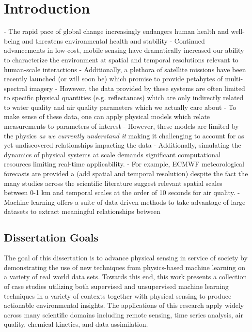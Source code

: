 

\chapter{Introduction}\label{ch:intro}
- The rapid pace of global change increasingly endangers human health and well-being
and threatens environmental health and stability
- Continued advancements in low-cost, mobile sensing have dramatically increased
our ability to characterize the environment at spatial and temporal resolutions
relevant to human-scale interactions
- Additionally, a plethora of satellite missions have been recently launched (or
will soon be) which promise to provide petabytes of multi-spectral imagery
- However, the data provided by these systems are often limited to specific
physical quantities (e.g. reflectances) which are only indirectly related to water quality and air
quality parameters which we actually care about
- To make sense of these data, one can apply physical models which relate
measurements to parameters of interest
- However, these models are limited by the physics \textit{as we currently
  understand it} making it challenging to account for as yet undiscovered
relationships impacting the data 
- Additionally, simulating the dynamics of physical systems at scale demands 
significant computational resources limiting real-time applicability.
- For example, ECMWF meteorological forecasts are provided a (add spatial and
temporal resolution) despite the fact the many studies across the scientific
literature suggest relevant spatial scales between 0-1 km and temporal scales at
the order of 10 seconds for air quality.
- Machine learning offers a suite of data-driven methods to take advantage of
large datasets to extract meaningful relationships between 





\section{Dissertation Goals}


The goal of this dissertation is to advance physical sensing in service of society by demonstrating the use of new techniques from physics-based machine learning on a variety of real world data sets. Towards this end, this work presents a collection of case studies utilizing both supervised and unsupervised machine learning techniques in a variety of contexts together with physical sensing to produce actionable environmental insights. The applications of this research apply widely across many scientific domains including remote sensing, time series analysis, air quality, chemical kinetics, and data assimilation.



